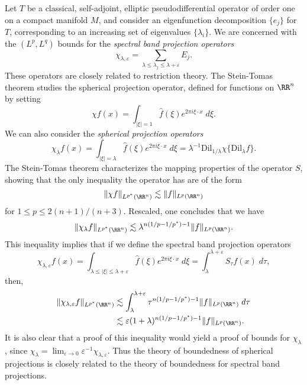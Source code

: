 Let $T$ be a classical, self-adjoint, elliptic pseudodifferential operator of order one on a compact manifold $M$, and consider an eigenfunction decomposition $\{ e_j \}$ for $T$, corresponding to an increasing set of eigenvalues $\{ \lambda_i \}$. We are concerned with the $(L^p,L^q)$ bounds for the \emph{spectral band projection operators}
%
\[ \chi_{\lambda,\varepsilon} = \sum_{\lambda \leq \lambda_j \leq \lambda + \varepsilon} E_j. \]
%
These operators are closely related to restriction theory. The Stein-Tomas theorem studies the spherical projection operator, defined for functions on $\RR^n$ by setting
%
\[ \chi f(x) = \int_{|\xi| = 1} \widehat{f}(\xi) e^{2 \pi i \xi \cdot x}\; d\xi. \]
%
We can also consider the \emph{spherical projection operators}
%
\[ \chi_\lambda f(x) = \int_{|\xi| = \lambda} \widehat{f}(\xi) e^{2 \pi i \xi \cdot x}\; d\xi = \lambda^{-1} \text{Dil}_{1/\lambda} \chi \{ \text{Dil}_\lambda f \}. \]
%
The Stein-Tomas theorem characterizes the mapping properties of the operator $S$, showing that the only inequality the operator has are of the form
%
\[ \| \chi f \|_{L^{p^*}(\RR^n)} \lesssim \| f \|_{L^p(\RR^n)} \]
%
for $1 \leq p \leq 2(n+1)/(n+3)$. Rescaled, one concludes that we have
%
\[ \| \chi_\lambda f \|_{L^{p^*}(\RR^n)} \lesssim \lambda^{n(1/p - 1/p^*)-1} \| f \|_{L^p(\RR^n)}. \]
%
This inequality implies that if we define the spectral band projection operators
%
\[ \chi_{\lambda,\varepsilon} f(x) = \int_{\lambda \leq |\xi| \leq \lambda + \varepsilon} \widehat{f}(\xi) e^{2 \pi i \xi \cdot x}\; d\xi = \int_\lambda^{\lambda + \varepsilon} S_\tau f(x)\; d\tau, \]
%
then,
%
\begin{align*}
    \| \chi_{\lambda,\varepsilon} f \|_{L^{p^*}(\RR^n)} &\lesssim \int_\lambda^{\lambda + \varepsilon} \tau^{n(1/p - 1/p^*) - 1} \| f \|_{L^p(\RR^n)}\; d\tau\\
    &\lesssim \varepsilon (1 + \lambda)^{n(1/p - 1/p^*) - 1} \| f \|_{L^p(\RR^n)}.
\end{align*}
%
It is also clear that a proof of this inequality would yield a proof of bounds for $\chi_\lambda$, since $\chi_\lambda = \lim_{\varepsilon \to 0} \varepsilon^{-1} \chi_{\lambda, \varepsilon}$. Thus the theory of boundedness of spherical projections is closely related to the theory of boundedness for spectral band projections.

